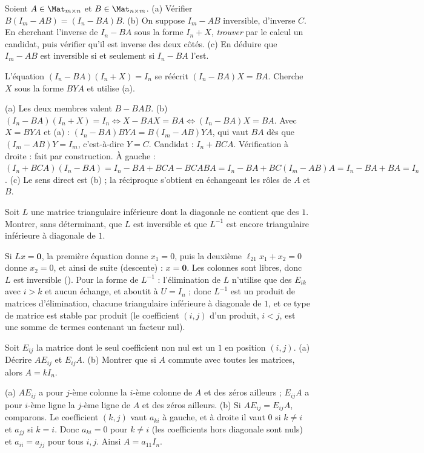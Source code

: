 \begin{exo}[S][Échanger $AB$ et $BA$]
Soient $A\in\Mat_{m\times n}$ et $B\in\Mat_{n\times m}$. (a) Vérifier $B(I_m-AB)=(I_n-BA)B$. (b) On suppose $I_m-AB$ inversible, d'inverse $C$. En cherchant l'inverse de $I_n-BA$ sous la forme $I_n+X$, \emph{trouver} par le calcul un candidat, puis vérifier qu'il est inverse des deux côtés. (c) En déduire que $I_m-AB$ est inversible si et seulement si $I_n-BA$ l'est.
\begin{indication}
L'équation $(I_n-BA)(I_n+X)=I_n$ se réécrit $(I_n-BA)X=BA$. Cherche $X$ sous la forme $BYA$ et utilise (a).
\end{indication}
\begin{corrige}
(a) Les deux membres valent $B-BAB$.
(b) $(I_n-BA)(I_n+X)=I_n\iff X-BAX=BA\iff(I_n-BA)X=BA$. Avec $X=BYA$ et (a) : $(I_n-BA)BYA=B(I_m-AB)YA$, qui vaut $BA$ dès que $(I_m-AB)Y=I_m$, c'est-à-dire $Y=C$. Candidat : $I_n+BCA$. Vérification à droite : fait par construction. À gauche : $(I_n+BCA)(I_n-BA)=I_n-BA+BCA-BCABA=I_n-BA+BC(I_m-AB)A=I_n-BA+BA=I_n$.
(c) Le sens direct est (b) ; la réciproque s'obtient en échangeant les rôles de $A$ et $B$.
\end{corrige}
\end{exo}
\begin{exo}
Soit $L$ une matrice triangulaire inférieure dont la diagonale ne contient que des $1$. Montrer, sans déterminant, que $L$ est inversible et que $L^{-1}$ est encore triangulaire inférieure à diagonale de $1$.
\begin{corrige}
Si $Lx=\mathbf 0$, la première équation donne $x_1=0$, puis la deuxième $\ell_{21}x_1+x_2=0$ donne $x_2=0$, et ainsi de suite (descente) : $x=\mathbf 0$. Les colonnes sont libres, donc $L$ est inversible (). Pour la forme de $L^{-1}$ : l'élimination de $L$ n'utilise que des $E_{ik}$ avec $i>k$ et aucun échange, et aboutit à $U=I_n$ ; donc $L^{-1}$ est un produit de matrices d'élimination, chacune triangulaire inférieure à diagonale de $1$, et ce type de matrice est stable par produit (le coefficient $(i,j)$ d'un produit, $i<j$, est une somme de termes contenant un facteur nul).
\end{corrige}
\end{exo}
\begin{exo}\label{exo-centre}
Soit $E_{ij}$ la matrice dont le seul coefficient non nul est un $1$ en position $(i,j)$. (a) Décrire $AE_{ij}$ et $E_{ij}A$. (b) Montrer que si $A$ commute avec toutes les matrices, alors $A=kI_n$.
\begin{corrige}
(a) $AE_{ij}$ a pour $j$-ème colonne la $i$-ème colonne de $A$ et des zéros ailleurs ; $E_{ij}A$ a pour $i$-ème ligne la $j$-ème ligne de $A$ et des zéros ailleurs.
(b) Si $AE_{ij}=E_{ij}A$, comparons. Le coefficient $(k,j)$ vaut $a_{ki}$ à gauche, et à droite il vaut $0$ si $k\neq i$ et $a_{jj}$ si $k=i$. Donc $a_{ki}=0$ pour $k\neq i$ (les coefficients hors diagonale sont nuls) et $a_{ii}=a_{jj}$ pour tous $i,j$. Ainsi $A=a_{11}I_n$.
\end{corrige}
\end{exo}
